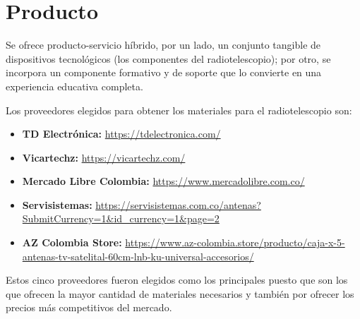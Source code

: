\section{Producto}%
\label{sec:Producto}

Se ofrece producto-servicio híbrido, por un lado, un conjunto tangible de
dispositivos tecnológicos (los componentes del radiotelescopio);
por otro, se incorpora un componente formativo y de soporte que lo convierte en
una experiencia educativa completa.

Los proveedores elegidos para obtener los materiales para el radiotelescopio son:

\begin{itemize}
  \item \textbf{TD Electrónica:} \url{https://tdelectronica.com/}
  \item \textbf{Vicartechz:} \url{https://vicartechz.com/}
  \item \textbf{Mercado Libre Colombia:} \url{https://www.mercadolibre.com.co/}
  \item \textbf{Servisistemas:} \url{https://servisistemas.com.co/antenas?SubmitCurrency=1&id_currency=1&page=2}
  \item \textbf{AZ Colombia Store:} \url{https://www.az-colombia.store/producto/caja-x-5-antenas-tv-satelital-60cm-lnb-ku-universal-accesorios/}
\end{itemize}

Estos cinco proveedores fueron elegidos como los principales puesto que son los
que ofrecen la mayor cantidad de materiales necesarios y también por ofrecer
los precios más competitivos del mercado.
